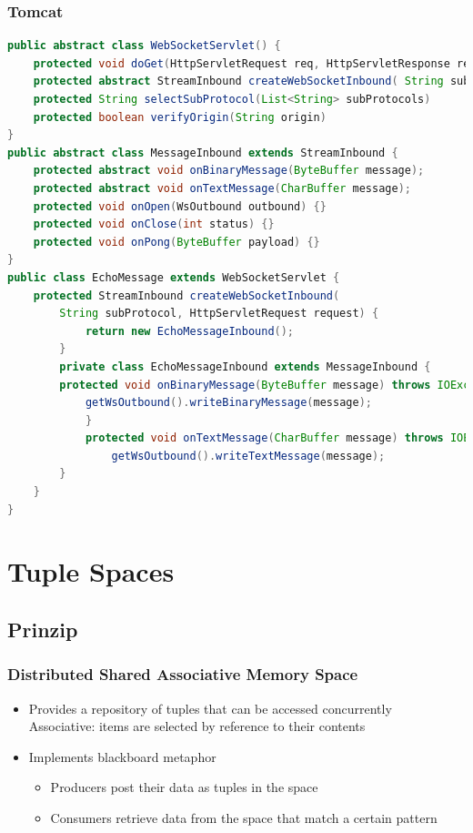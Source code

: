 \documentclass[10pt]{article}
\begin{document}
\subsubsection{Tomcat}
\begin{lstlisting}[language=Java, caption=Echo Server, style=JavaStyle]
public abstract class WebSocketServlet() {
	protected void doGet(HttpServletRequest req, HttpServletResponse resp) {...}
	protected abstract StreamInbound createWebSocketInbound( String subProtocol, HttpServletRequest request);
	protected String selectSubProtocol(List<String> subProtocols)
	protected boolean verifyOrigin(String origin)
}
public abstract class MessageInbound extends StreamInbound {
	protected abstract void onBinaryMessage(ByteBuffer message);
	protected abstract void onTextMessage(CharBuffer message);
	protected void onOpen(WsOutbound outbound) {} 
	protected void onClose(int status) {} 	
	protected void onPong(ByteBuffer payload) {}
}
public class EchoMessage extends WebSocketServlet {
	protected StreamInbound createWebSocketInbound(
		String subProtocol, HttpServletRequest request) {
			return new EchoMessageInbound();
		}
		private class EchoMessageInbound extends MessageInbound {
		protected void onBinaryMessage(ByteBuffer message) throws IOException {
			getWsOutbound().writeBinaryMessage(message);
    		}
    		protected void onTextMessage(CharBuffer message) throws IOException {
    			getWsOutbound().writeTextMessage(message);
		}
	}
}
\end{lstlisting}

\newpage
\section{Tuple Spaces}
\subsection{Prinzip}
\subsubsection{Distributed Shared Associative Memory Space}
\begin{itemize}
	\item Provides a repository of tuples that can be accessed concurrently \\
		Associative: items are selected by reference to their contents 
	\item Implements blackboard metaphor
		\begin{itemize}
			\item Producers post their data as tuples in the space
			\item Consumers retrieve data from the space that match a certain pattern
		\end{itemize}
\end{itemize}
\end{document}
